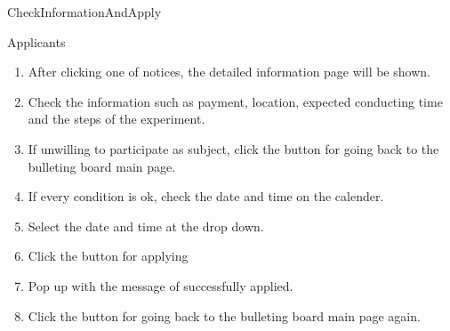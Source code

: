\documentclass[letterpaper, 10 pt, conference]{ieeeconf}  %
\begin{document}
CheckInformationAndApply\\

Applicants\\

\begin{enumerate}
    \item After clicking one of notices, the detailed information page will be shown.
\item Check the information such as payment, location, expected conducting time and the steps of the experiment.
\item If unwilling to participate as subject, click the button for going back to the bulleting board main page.
\item If every condition is ok, check the date and time on the calender.
\item Select the date and time at the drop down.
\item Click the button for applying
\item Pop up with the message of successfully applied. 
\item Click the button for going back to the bulleting board main page again.
\end{enumerate}

\subsection{}
\\

\\
\end{document}
